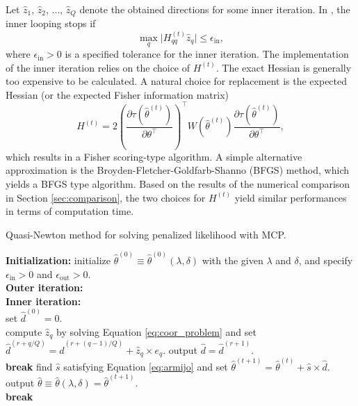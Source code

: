 \documentclass[nojss]{jss}
\begin{document}
Let $\hat{z}_1$, $\hat{z}_2$, ..., $\hat{z}_Q$ denote the obtained directions for some inner iteration. In , the inner looping stops if 
%
\begin{equation} \label{eq:in_stop}
\max_{q} \big | H_{qq}^{(t)} \hat{z}_q \big | \leq \epsilon_{\mathrm{in}},
\end{equation}
%
where $\epsilon_{\mathrm{in}}>0$ is a specified tolerance for the inner iteration. The implementation of the inner iteration relies on the choice of $H^{(t)}$. The exact Hessian is generally too expensive to be calculated. A natural choice for replacement is the expected Hessian (or the expected Fisher information matrix)
%
\begin{equation}
H^{(t)} = 2 \left( \frac{\partial \tau(\hat{\theta}^{(t)})}{\partial \theta^\top} \right)^\top W(\hat{\theta}^{(t)}) \frac{\partial \tau(\hat{\theta}^{(t)})}{\partial \theta^\top},
\end{equation}
%
which results in a Fisher scoring-type algorithm. A simple alternative approximation is the Broyden-Fletcher-Goldfarb-Shanno (BFGS) method, which yields a BFGS type algorithm. Based on the results of the numerical comparison in Section \ref{sec:comparison}, the two choices for $H^{(t)}$ yield similar performances in terms of computation time.

\begin{algorithm}[htb] 
  \caption{Quasi-Newton method for solving penalized likelihood with MCP.}
  \label{alg:opt}
\textbf{Initialization:} initialize $\hat{\theta}^{(0)} \equiv \hat{\theta}^{(0)}(\lambda,\delta)$ with the given $\lambda$ and $\delta$, and specify $\epsilon_{\mathrm{in}}>0$ and $\epsilon_{\mathrm{out}}>0$. \\
\textbf{Outer iteration:}\\
 {
\textbf{Inner iteration:}\\
set $\hat{d}^{(0)}=0$. \\
 {
 {
compute $\hat{z}_{q}$ by solving Equation \ref{eq:coor_problem} and set $\hat{d}^{(r+q/Q)} = \hat{d}^{(r+(q-1)/Q)}+ \hat{z}_{q} \times e_{q}$.
}
 {
output $\hat{d} = \hat{d}^{(r + 1)}$. \\
\textbf{break}}
}
find $\hat{s}$ satisfying Equation \ref{eq:armijo} and set $\hat{\theta}^{(t+1)} = \hat{\theta}^{(t)} + \hat{s} \times \hat{d}$. \\
 {
output $\hat{\theta} \equiv \hat{\theta}(\lambda,\delta)=\hat{\theta}^{(t + 1)}$. \\
\textbf{break}}
}
\end{algorithm}
\end{document}
